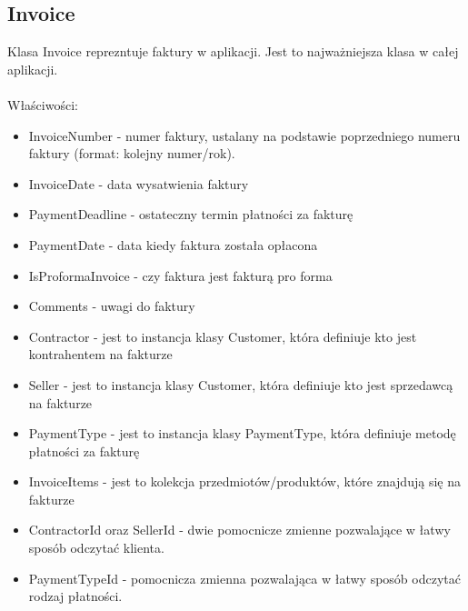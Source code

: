 \subsection{Invoice}
Klasa Invoice reprezntuje faktury w aplikacji. Jest to najważniejsza klasa w całej aplikacji.
\\\\
Właściwości:
\begin{itemize}
    \item InvoiceNumber - numer faktury, ustalany na podstawie poprzedniego numeru faktury (format: kolejny numer/rok).
    \item InvoiceDate - data wysatwienia faktury
    \item PaymentDeadline - ostateczny termin płatności za fakturę
    \item PaymentDate - data kiedy faktura została opłacona
    \item IsProformaInvoice - czy faktura jest fakturą pro forma
    \item Comments - uwagi do faktury
    \item Contractor - jest to instancja klasy Customer, która definiuje kto jest kontrahentem na fakturze
    \item Seller - jest to instancja klasy Customer, która definiuje kto jest sprzedawcą na fakturze
    \item PaymentType - jest to instancja klasy PaymentType, która definiuje metodę płatności za fakturę
    \item InvoiceItems - jest to kolekcja przedmiotów/produktów, które znajdują się na fakturze
    \item ContractorId oraz SellerId - dwie pomocnicze zmienne pozwalające w łatwy sposób odczytać klienta.
    \item PaymentTypeId - pomocnicza zmienna pozwalająca w łatwy sposób odczytać rodzaj płatności.
\end{itemize}

